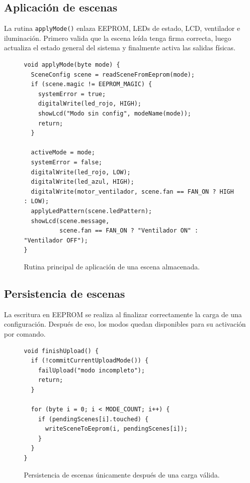 \documentclass[12pt,a4paper]{article}
\begin{document}
\subsection{Aplicación de escenas}
La rutina \texttt{applyMode()} enlaza EEPROM, LEDs de estado, LCD, ventilador e iluminación. Primero valida que la escena leída tenga firma correcta, luego actualiza el estado general del sistema y finalmente activa las salidas físicas.

\begin{figure}[H]
    \centering
    \begin{minipage}{0.9\textwidth}
        \begin{lstlisting}[basicstyle=\ttfamily\footnotesize]
void applyMode(byte mode) {
  SceneConfig scene = readSceneFromEeprom(mode);
  if (scene.magic != EEPROM_MAGIC) {
    systemError = true;
    digitalWrite(led_rojo, HIGH);
    showLcd("Modo sin config", modeName(mode));
    return;
  }

  activeMode = mode;
  systemError = false;
  digitalWrite(led_rojo, LOW);
  digitalWrite(led_azul, HIGH);
  digitalWrite(motor_ventilador, scene.fan == FAN_ON ? HIGH : LOW);
  applyLedPattern(scene.ledPattern);
  showLcd(scene.message,
          scene.fan == FAN_ON ? "Ventilador ON" : "Ventilador OFF");
}
        \end{lstlisting}
    \end{minipage}
    \caption{Rutina principal de aplicación de una escena almacenada.}
\end{figure}

\subsection{Persistencia de escenas}
La escritura en EEPROM se realiza al finalizar correctamente la carga de una configuración. Después de eso, los modos quedan disponibles para su activación por comando.

\begin{figure}[H]
    \centering
    \begin{minipage}{0.9\textwidth}
        \begin{lstlisting}[basicstyle=\ttfamily\footnotesize]
void finishUpload() {
  if (!commitCurrentUploadMode()) {
    failUpload("modo incompleto");
    return;
  }

  for (byte i = 0; i < MODE_COUNT; i++) {
    if (pendingScenes[i].touched) {
      writeSceneToEeprom(i, pendingScenes[i]);
    }
  }
}
        \end{lstlisting}
    \end{minipage}
    \caption{Persistencia de escenas únicamente después de una carga válida.}
\end{figure}
\end{document}
